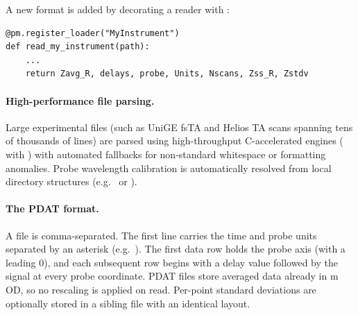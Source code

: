 A new format is added by decorating a reader with :

\begin{lstlisting}
@pm.register_loader("MyInstrument")
def read_my_instrument(path):
    ...
    return Zavg_R, delays, probe, Units, Nscans, Zss_R, Zstdv
\end{lstlisting}

\paragraph{High-performance file parsing.}
Large experimental files (such as UniGE fsTA and Helios TA scans spanning tens of thousands of lines) are parsed using high-throughput C-accelerated engines ( with ) with automated fallbacks for non-standard whitespace or formatting anomalies. Probe wavelength calibration is automatically resolved from local directory structures (e.g.\  or ).

\paragraph{The PDAT format.}
A  file is comma-separated. The first line carries the time and
probe units separated by an asterisk (e.g.\ ).
The first data row holds the probe axis (with a leading $0$), and each
subsequent row begins with a delay value followed by the signal at every probe
coordinate. PDAT files store averaged data already in m\,OD, so no rescaling is
applied on read. Per-point standard deviations are optionally stored in a sibling
 file with an identical layout.

